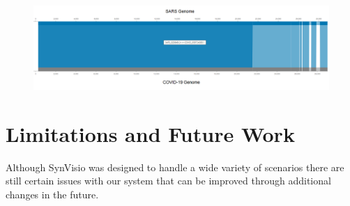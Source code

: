 \begin{figure}[h]
  \centering
  \includegraphics[width=1\linewidth]{images/ch_7_viral.PNG}
  \label{fig:ch_7_viral}
\end{figure}


 \section{Limitations and Future Work}
 
 Although SynVisio was designed to handle a wide variety of scenarios there are still certain issues with our system that can be improved through additional changes in the future. 
 
